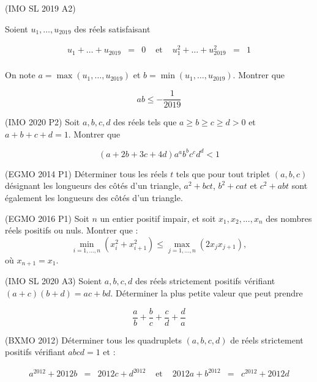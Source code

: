 \begin{exo}
(IMO SL 2019 A2)

Soient $u_1, \ldots , u_{2019}$ des réels satisfaisant

\[\begin{array}{lllllll}
u_1 + \ldots + u_{2019} &=& 0 & \text{ et } & u_1^2+ \ldots + u_{2019}^2 &=& 1 \\
\end{array}\]

On note $a= \max (u_1, \ldots , u_{2019})$ et $b= \min (u_1, \ldots , u_{2019})$. Montrer que

\[ab \leqslant - \frac1{2019}\]
\end{exo}

\begin{exo}
(IMO 2020 P2)
Soit $a,b,c,d$ des réels tels que $a\geqslant b \geqslant c\geqslant d >0$ et $a+b+c+d=1$. Montrer que

\[(a+2b+3c+4d)a^ab^bc^cd^d<1\]

\end{exo}

\begin{exo}
(EGMO 2014 P1)
Déterminer tous les réels $t$ tels que pour tout triplet $(a,b,c)$ désignant les longueurs des côtés d'un triangle, $a^2+bct$, $b^2+cat$ et $c^2+abt$ sont également les longueurs des côtés d'un triangle.
\end{exo}

\begin{exo}
(EGMO 2016 P1)
Soit $n$ un entier positif impair, et soit $x_1,x_2,...,x_n$ des nombres réels positifs ou nuls. Montrer que :
\[
\min_{i=1,...,n}(x_i^2+x_{i+1}^2) \leq \max_{j=1,...,n}(2x_jx_{j+1}),
\]
où $x_{n+1}=x_1$.
\end{exo}


\begin{exo}
(IMO SL 2020 A3)
Soient $a,b,c,d$ des réels strictement positifs vérifiant $(a+c)(b+d)=ac+bd$. Déterminer la plus petite valeur que peut prendre

\[\frac{a}{b}+\frac{b}{c}+\frac{c}{d}+\frac{d}{a}\]
\end{exo}

\begin{exo}
(BXMO 2012)
Déterminer tous les quadruplets $(a,b,c,d)$ de réels strictement positifs vérifiant $abcd=1$ et :

\[\begin{array}{lllllll}
a^{2012}+2012b &=& 2012c+d^{2012} &\text{ et } & 2012a+b^{2012} &=& c^{2012}+2012d\\
\end{array}\]
\end{exo}

